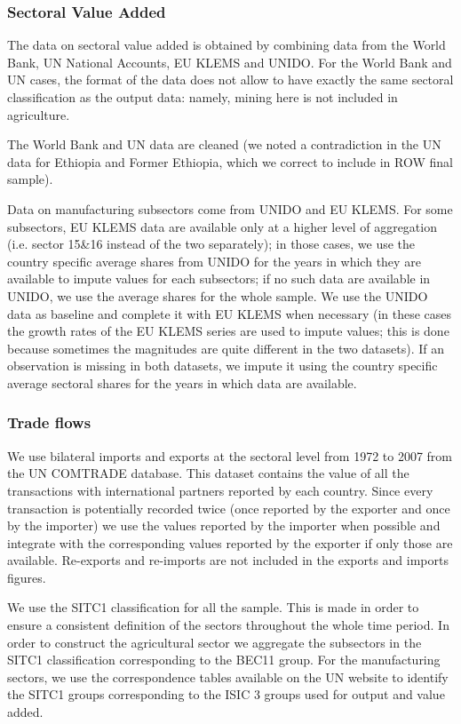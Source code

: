 \documentclass[12pt]{article}
\begin{document}
\subsubsection*{Sectoral Value Added}

The data on sectoral value added is obtained by combining data from the
World Bank, UN National Accounts, EU KLEMS and UNIDO. For the World Bank and
UN cases, the format of the data does not allow to have exactly the same
sectoral classification as the output data: namely, mining here is not
included in agriculture.

The World Bank and UN data are cleaned (we noted a contradiction in the UN
data for Ethiopia and Former Ethiopia, which we correct to include in ROW
final sample).

Data on manufacturing subsectors come from UNIDO and EU KLEMS. For some
subsectors, EU KLEMS data are available only at a higher level of
aggregation (i.e. sector 15\&16 instead of the two separately); in those
cases, we use the country specific average shares from UNIDO for the years
in which they are available to impute values for each subsectors; if no such
data are available in UNIDO, we use the average shares for the whole sample.
We use the UNIDO data as baseline and complete it with EU KLEMS when
necessary (in these cases the growth rates of the EU KLEMS series are used
to impute values; this is done because sometimes the magnitudes are quite
different in the two datasets). If an observation is missing in both
datasets, we impute it using the country specific average sectoral shares
for the years in which data are available.

\subsubsection*{Trade flows}

We use bilateral imports and exports at the sectoral level from 1972 to 2007
from the UN COMTRADE database. This dataset contains the value of all the
transactions with international partners reported by each country. Since
every transaction is potentially recorded twice (once reported by the
exporter and once by the importer) we use the values reported by the
importer when possible and integrate with the corresponding values reported
by the exporter if only those are available. Re-exports and re-imports are
not included in the exports and imports figures.

We use the SITC1 classification for all the sample. This is made in order to
ensure a consistent definition of the sectors throughout the whole time
period. In order to construct the agricultural sector we aggregate the
subsectors in the SITC1 classification corresponding to the BEC11 group. For
the manufacturing sectors, we use the correspondence tables available on the
UN website to identify the SITC1 groups corresponding to the ISIC 3 groups
used for output and value added.
\end{document}

